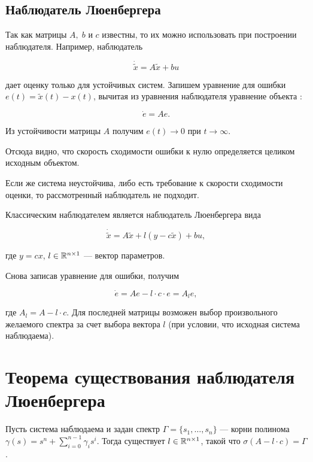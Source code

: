 \documentclass[../../TAU.tex]{subfiles}
\begin{document}
\subsection{Наблюдатель Люенбергера}\cite{andr}

    Так как матрицы $A,\; b$ и $c$ известны, то их можно использовать при построении наблюдателя. Например, наблюдатель

    $$
        \dot{\tilde x} = A\tilde x + bu
    $$

    дает оценку только для устойчивых систем. Запишем уравнение для ошибки $e(t) = \tilde x (t) - x(t)$, вычитая из уравнения наблюдателя уравнение объекта :

    $$
        \dot e = A e.
    $$
    
    Из устойчивости матрицы $A$ получим $e(t)\rightarrow0$ при $t\rightarrow\infty$.

    Отсюда видно, что скорость сходимости ошибки к нулю определяется целиком исходным объектом.

    Если же система неустойчива, либо есть требование к скорости сходимости оценки, то рассмотренный наблюдатель не подходит.

    Классическим наблюдателем является наблюдатель Люенбергера вида
    
    $$
        \dot{\tilde x} = A\tilde x + l (y-c\tilde x) + b u,
    $$
    
    где $y = cx$, $l\in\mathbb{R}^{n\times 1}$ --- вектор параметров.

    Снова записав уравнение для ошибки, получим
    
    $$
        \dot e = A e - l\cdot c\cdot e = A_l e,
    $$
    
    где $A_l = A-l\cdot c$. Для последней матрицы возможен выбор произвольного желаемого спектра за счет выбора вектора $l$ (при условии, что исходная система наблюдаема).

\section{Теорема существования наблюдателя Люенбергера}

    \begin{theor}
        Пусть система  наблюдаема и задан спектр $\Gamma=\{s_1,\ldots, s_n\}$ --- корни полинома $\gamma(s)=s^n+\sum_{i=0}^{n-1}\gamma_i s^i$.
        Тогда существует $l\in\mathbb{R}^{n\times 1}$, такой что $\sigma(A-l\cdot c) = \Gamma$.
    \end{theor}
\end{document}
